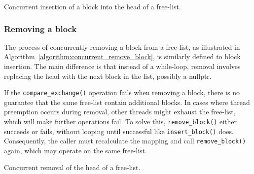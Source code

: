 \begin{algorithm}[H]
    \SetAlgoLined

\label{algorithm:concurrent_insert_block}
\caption{Concurrent insertion of a block into the head of a free-list.}
\end{algorithm}

\newpage
\subsubsection{Removing a block}

The process of concurrently removing a block from a free-list, as illustrated in Algorithm~\ref{algorithm:concurrent_remove_block}, is similarly defined to block insertion. The main difference is that instead of a while-loop, removal involves replacing the head with the next block in the list, possibly a nullptr.

If the \texttt{compare\_exchange()} operation fails when removing a block, there is no guarantee that the same free-list contain additional blocks. In cases where thread preemption occurs during removal, other threads might exhaust the free-list, which will make further operations fail. To solve this, \texttt{remove\_block()} either succeeds or fails, without looping until successful like \texttt{insert\_block()} does. Consequently, the caller must recalculate the mapping and call \texttt{remove\_block()} again, which may operate on the same free-list.


\begin{algorithm}[H]
    \SetAlgoLined


\label{algorithm:concurrent_remove_block}
\caption{Concurrent removal of the head of a free-list.}
\end{algorithm}

